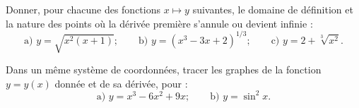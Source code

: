 \documentclass[12pt,french,oneside,a4paper]{memoir} %
\begin{document}
\begin{exo}
Donner, pour chacune des fonctions $x\mapsto y$ suivantes, le
 domaine de définition et la nature des points où la dérivée
 première s'annule ou devient infinie :
 \begin{equation*}
 \mbox{a) }\displaystyle{y=\sqrt{x^2(x+1)}};\qquad
 \mbox{b) }\displaystyle{y=(x^3-3x+2)^{1/3}};\qquad
 \mbox{c) }\displaystyle{y=2+\sqrt[3]{x^2}}.
\end{equation*}
\end{exo}
\begin{exo}
Dans un même système de coordonnées, tracer les graphes
 de la fonction $y=y(x)$ donnée et de sa dérivée, pour : \begin{equation*}
 \mbox{a) }\displaystyle{y=x^3-6x^2+9x};\qquad
 \mbox{b) }\displaystyle{y=\sin^2x}.
\end{equation*}
\end{exo}
\end{document}
